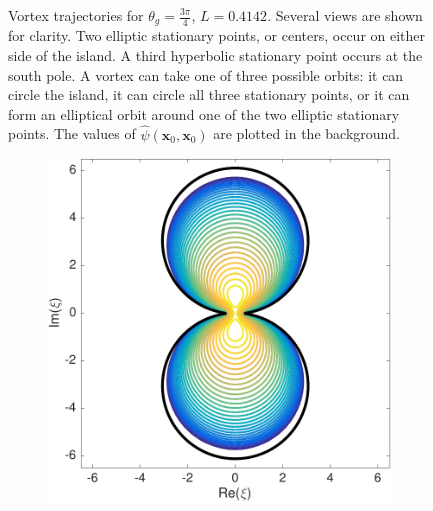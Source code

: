 \documentclass{sfuthesis}
\begin{document}
\begin{figure}[h]
\begin{subfigure}[b]{0.3\textwidth}
        \end{subfigure}
	\caption{Vortex trajectories for $\theta_g=\frac{3\pi}{4}$, $L=0.4142$. Several views are shown for clarity. Two elliptic stationary points, or centers, occur on either side of the island. A third hyperbolic stationary point occurs at the south pole. A vortex can take one of three possible orbits: it can circle the island, it can circle all three stationary points, or it can form an elliptical orbit around one of the two elliptic stationary points. The values of $\hat{\psi}(\mathbf{x}_0, \mathbf{x}_0)$ are plotted in the background.}
	\label{fig: Ex6-8LongIsland}
\end{figure}
 
 \begin{figure}[h]
	\centering
	\begin{subfigure}[b]{0.4\textwidth}
  		\includegraphics[width=\textwidth]{Ex6-8LongIslandStereo}
		\caption{}
   	\end{subfigure}\hspace{0.3cm}
   	\begin{subfigure}[b]{0.4\textwidth}

\end{subfigure}
\end{figure}
\end{document}
